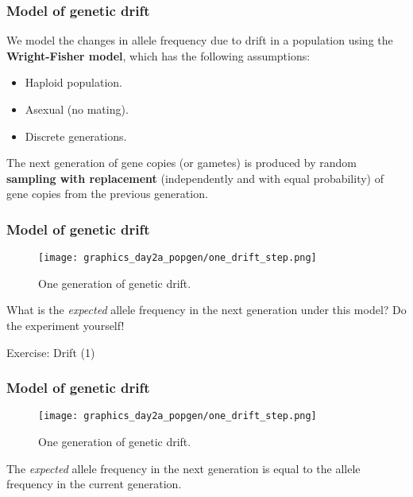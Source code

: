 \documentclass{beamer}
\newcommand{\1}{\ensuremath{\mathbf{1}}}
\begin{document}
%
%
%
\begin{frame}\frametitle{Model of genetic drift}
	We model the changes in allele frequency due to drift in a population using the \textbf{Wright-Fisher model}, which has the following assumptions:
	\begin{itemize}
		\item Haploid population.
		\item Asexual (no mating).
		\item Discrete generations.
	\end{itemize}
	\begin{block}{}
		The next generation of gene copies (or gametes) is produced by random \textbf{sampling with replacement} (independently and with equal probability) of gene copies from the previous generation.
	\end{block}
\end{frame}
%
%
%
\begin{frame}\frametitle{Model of genetic drift}
	\begin{figure}
	\begin{center}
		\texttt{[image: graphics\_day2a\_popgen/one\_drift\_step.png]}
	\end{center}
	\caption{One generation of genetic drift.}
	\end{figure}
	What is the \emph{expected} allele frequency in the next generation under this model? Do the experiment yourself!
\end{frame}
%
%
%
\begin{frame}
	\begin{center}
		Exercise: Drift (1)
	\end{center}
\end{frame}
%
%
%
\begin{frame}\frametitle{Model of genetic drift}
	\begin{figure}
	\begin{center}
		\texttt{[image: graphics\_day2a\_popgen/one\_drift\_step.png]}
	\end{center}
	\caption{One generation of genetic drift.}
	\end{figure}
	The \emph{expected} allele frequency in the next generation is equal to the allele frequency in the current generation.
\end{frame}
\end{document}
